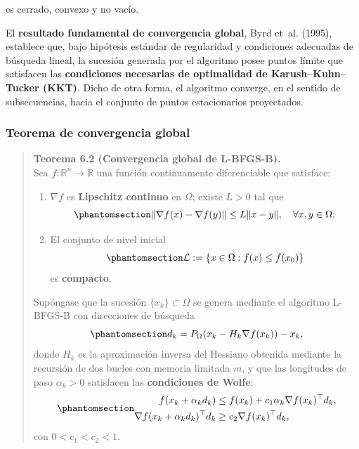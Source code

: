 \documentclass[
  spanish,
  us-letterpaper,
]{scrreprt}
\providecommand{\tightlist}{%
  \setlength{\itemsep}{0pt}\setlength{\parskip}{0pt}}
\numberwithin{equation}{section}
\begin{document}
es cerrado, convexo y no vacío.

El \textbf{resultado fundamental de convergencia global}, Byrd et~al.
(1995), establece que, bajo hipótesis estándar de regularidad y
condiciones adecuadas de búsqueda lineal, la sucesión generada por el
algoritmo posee puntos límite que satisfacen las \textbf{condiciones
necesarias de optimalidad de Karush--Kuhn--Tucker (KKT)}. Dicho de otra
forma, el algoritmo converge, en el sentido de subsecuencias, hacia el
conjunto de puntos estacionarios proyectados.

\subsubsection{Teorema de convergencia
global}\label{sec-teorema_convergencia}

\begin{quote}
\textbf{Teorema 6.2 (Convergencia global de L-BFGS-B).}\\
Sea \(f : \mathbb{R}^n \to \mathbb{R}\) una función continuamente
diferenciable que satisface:

\begin{enumerate}
\def\labelenumi{\arabic{enumi}.}
\tightlist
\item
  \(\nabla f\) es \textbf{Lipschitz continuo} en \(\Omega\); existe
  \(L > 0\) tal que\\
  \begin{equation}\phantomsection\label{eq-61}{
  \|\nabla f(x) - \nabla f(y)\| \le L \|x - y\|, \quad \forall x, y \in \Omega;
  }\end{equation}
\item
  El conjunto de nivel inicial\\
  \begin{equation}\phantomsection\label{eq-62}{
  \mathcal{L} := \{x \in \Omega : f(x) \le f(x_0)\} 
  }\end{equation} es \textbf{compacto}.
\end{enumerate}

Supóngase que la sucesión \(\{x_k\} \subset \Omega\) se genera mediante
el algoritmo L-BFGS-B con direcciones de búsqueda
\begin{equation}\phantomsection\label{eq-63}{
d_k = P_\Omega(x_k - H_k \nabla f(x_k)) - x_k, 
}\end{equation} donde \(H_k\) es la aproximación inversa del Hessiano
obtenida mediante la recursión de dos bucles con memoria limitada \(m\),
y que las longitudes de paso \(\alpha_k > 0\) satisfacen las
\textbf{condiciones de Wolfe}:
\begin{equation}\phantomsection\label{eq-64}{
\begin{aligned}
f(x_k + \alpha_k d_k) &\le f(x_k) + c_1 \alpha_k \nabla f(x_k)^\top d_k, \\
\nabla f(x_k + \alpha_k d_k)^\top d_k &\ge c_2 \nabla f(x_k)^\top d_k,
\end{aligned} 
}\end{equation} con \(0 < c_1 < c_2 < 1\).


\end{quote}
\end{document}
